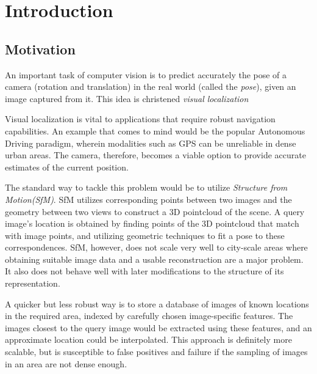 

\chapter{Introduction}
\section{Motivation}
An important task of computer vision is to predict accurately the pose of a camera (rotation and translation) in the real world (called the \emph{pose}), given an image captured from it. This idea is christened \emph{visual localization} 

Visual localization is vital to applications that require robust navigation capabilities. An example that comes to mind would be the popular Autonomous Driving paradigm, wherein modalities such as GPS can be unreliable in dense urban areas. The camera, therefore, becomes a viable option to provide accurate estimates of the current position. 

The standard way to tackle this problem would be to utilize \emph{Structure from Motion(SfM)}. SfM utilizes corresponding points between two images and the geometry between two views to construct a 3D pointcloud of the scene. A query image's location is obtained by finding points of the 3D pointcloud that match with image points, and utilizing geometric techniques to fit a pose to these correspondences. SfM, however, does not scale very well to city-scale areas where obtaining suitable image data and a usable reconstruction are a major problem. It also does not behave well with later modifications to the structure of its representation.

A quicker but less robust way is to store a database of images of known locations in the required area, indexed by carefully chosen image-specific features. The images closest to the query image would be extracted using these features, and an approximate location could be interpolated. This approach is definitely more scalable, but is susceptible to false positives and failure if the sampling of images in an area are not dense enough. 

